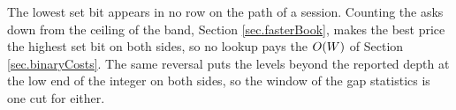The lowest set bit appears in no row on the path of a session.
Counting the asks down from the ceiling of the band,
Section \ref{sec.fasterBook},
makes the best price the highest set bit on both sides,
so no lookup pays the $O(W)$ of Section \ref{sec.binaryCosts}.
The same reversal puts the levels beyond the reported depth at the low end of the integer
on both sides,
so the window of the gap statistics is one cut for either.
